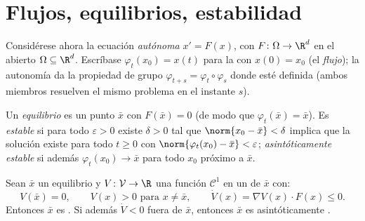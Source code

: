 \section{Flujos, equilibrios, estabilidad}

Considérese ahora la ecuación \emph{autónoma} $x' = F(x)$, con $F
\colon \Omega \to \R^d$  en el abierto $\Omega
\subseteq \R^d$. Escríbase $\varphi_t(x_0) = x(t)$ para la
 con $x(0) = x_0$ (el
\emph{flujo}); la autonomía da la
propiedad de grupo $\varphi_{t+s} =
\varphi_t\circ\varphi_s$ donde esté definida (ambos miembros resuelven
el mismo problema en el instante $s$).

\begin{definition}\label{def:b3:ode:stability}
Un \emph{equilibrio} es un punto $\bar x$ con $F(\bar x) =
0$ (de modo que $\varphi_t(\bar x) = \bar x$). Es
\emph{estable} si para todo
$\varepsilon > 0$ existe $\delta > 0$ tal que
$\norm{x_0 - \bar x} < \delta$ implica que la solución existe para todo
$t \geq 0$ con $\norm{\varphi_t(x_0) - \bar
x} < \varepsilon$; \emph{asintóticamente estable} si además
$\varphi_t(x_0) \to \bar x$ para todo $x_0$ próximo a $\bar x$.
\end{definition}

\begin{theorem}\label{thm:b3:ode:lyapunov}
Sean $\bar x$ un equilibrio y $V \colon \mathcal V \to
\R$ una función $\mathcal C^1$ en un
 de $\bar x$
con:
\[
V(\bar x) = 0,\qquad V(x) > 0 \text{ para } x \neq \bar x,
\qquad \dot V(x) = \nabla V(x)\cdot F(x) \leq 0 .
\]
Entonces $\bar x$ es . Si además
$\dot V < 0 $ fuera de $\bar
x$, entonces $\bar x$ es asintóticamente
.
\end{theorem}


